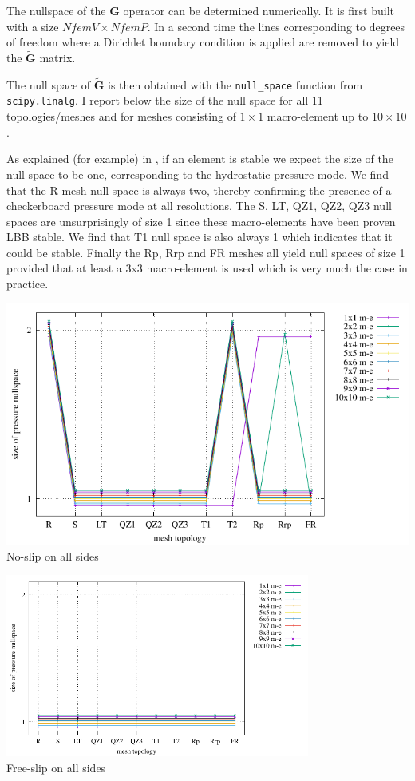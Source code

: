 \documentclass[a4paper,12pt]{article}
\begin{document}
The nullspace of the ${ \bm G}$ operator can be determined 
numerically. It is first built with a size $NfemV \times NfemP$.
In a second time the lines corresponding to degrees of freedom 
where a Dirichlet boundary condition is applied are removed to yield
the $\tilde{\bm G}$ matrix. 

The null space of $\tilde{\bm G}$ is then obtained with the 
{\tt null\_space} function from {\tt scipy.linalg}.
I report below the size of the null space for all 11 topologies/meshes
and for meshes consisting of $1\times 1$ macro-element up to $10\times 10$.

As explained (for example) in \cite{sagl81a}, if an element is stable we 
expect the size of the null space to be one, corresponding to the 
hydrostatic pressure mode.
We find that the R mesh null space is always two, thereby confirming 
the presence of a checkerboard pressure mode at all resolutions. 
The S, LT, QZ1, QZ2, QZ3 null spaces are unsurprisingly of size 1 since 
these macro-elements have been proven LBB stable. 
We find that T1 null space is also always 1 which indicates that it could
be stable. 
Finally the Rp, Rrp and FR meshes all yield null spaces of size 1 
provided that at least a 3x3 macro-element is used which is very much the 
case in practice. 



\begin{center}
\includegraphics[width=14cm]{../results/nullspace/nullspace_NS.pdf}\\
No-slip on all sides
\end{center}


\begin{center}
\includegraphics[width=10cm]{../results/nullspace/nullspace_FS.pdf}\\
Free-slip on all sides
\end{center}
\end{document}
